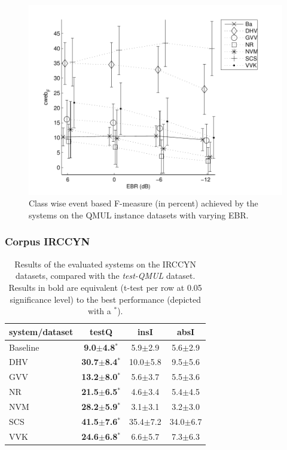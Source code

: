 \begin{figure}[t]
\begin{center}
\includegraphics[width=1\textwidth]{gfxML/ebr}
\caption{Class wise event based F-measure (in percent) achieved by the systems on the QMUL instance datasets with varying EBR.}
\label{fig:ebr} 
\end{center}
\end{figure}

\subsubsection{Corpus IRCCYN}

\begin{table}
\begin{center} 
\begin{tabular}{lccc}
system/dataset & testQ & insI & absI \\ 
\hline 
Baseline & \textbf{9.0$\pm$4.8$^*$}  &  5.9$\pm$2.9 &  5.6$\pm$2.9 \\ 
DHV      & \textbf{30.7$\pm$8.4$^*$} & 10.0$\pm$5.8 &  9.5$\pm$5.6 \\ 
GVV      & \textbf{13.2$\pm$8.0$^*$} &  5.6$\pm$3.7 &  5.5$\pm$3.6 \\
NR       & \textbf{21.5$\pm$6.5$^*$} &  4.6$\pm$3.4 &  5.4$\pm$4.5 \\ 
NVM      & \textbf{28.2$\pm$5.9$^*$} &  3.1$\pm$3.1 &  3.2$\pm$3.0 \\ 
SCS      & \textbf{41.5$\pm$7.6$^*$} & 35.4$\pm$7.2 & 34.0$\pm$6.7 \\ 
VVK      & \textbf{24.6$\pm$6.8$^*$} &  6.6$\pm$5.7 &  7.3$\pm$6.3 \\ 
\hline
\end{tabular} 
\end{center}  
\caption{Results of the evaluated systems on the IRCCYN datasets, compared with the \emph{test-QMUL} dataset. Results in bold are equivalent (t-test per row at 0.05 significance level) to the best performance (depicted with a $^*$).}
\label{tab:irccyn} 
\end{table} 

